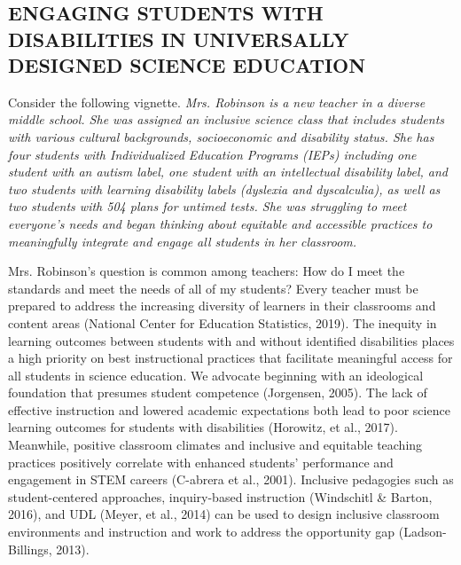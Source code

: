 \documentclass[11.5pt]{sig-alternate}
\begin{document}
\vspace{5mm}
\section*{\vspace{140mm}}
\begin{large}
\section*{ENGAGING STUDENTS WITH DISABILITIES IN UNIVERSALLY DESIGNED SCIENCE EDUCATION}

Consider the following vignette.\textit{ Mrs. Robinson is a new teacher in a diverse middle school. She was assigned an inclusive science class that includes students with various cultural backgrounds, socioeconomic and disability status. She has four students with Individualized Education Programs (IEPs) including one student with an autism label, one student with an intellectual disability label, and two students with learning disability labels (dyslexia and dyscalculia), as well as two students with 504 plans for untimed tests. She was struggling to meet everyone’s needs and began thinking about equitable and accessible practices to meaningfully integrate and engage all students in her classroom.}

Mrs. Robinson’s question is common among teachers: How do I meet the standards and meet the needs of all of my students? Every teacher must be prepared to address the increasing diversity of learners in their classrooms and content areas (National Center for Education Statistics, 2019). The inequity in learning outcomes between students with and without identified disabilities places a high priority on best instructional practices that facilitate meaningful access for all students in science education. We advocate beginning with an ideological foundation that presumes student competence (Jorgensen, 2005). The lack of effective instruction and lowered academic expectations both lead to poor science learning outcomes for students with disabilities (Horowitz, et al., 2017). Meanwhile, positive classroom climates and inclusive and equitable teaching practices positively correlate with enhanced students’ performance and engagement in STEM careers (C-abrera et al., 2001). Inclusive pedagogies such as student-centered approaches, inquiry-based instruction (Windschitl \& Barton, \\2016), and UDL (Meyer, et al., 2014) can be used to design inclusive classroom environments and instruction and work to address the opportunity gap (Ladson-Billings, 2013). 


\end{large}
\end{document}
